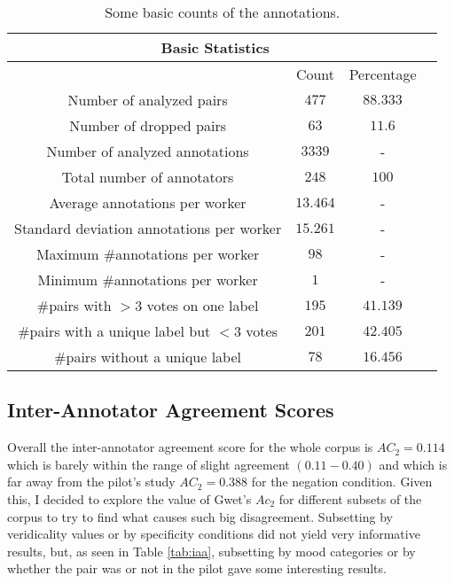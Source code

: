 \begin{table}
\begin{tabular}{|c|c|c|c|}
\hline
\multicolumn{3}{|c|}{Basic Statistics}\\\hline
                      & Count&Percentage\\\hline 
Number of analyzed pairs & $477$ & $88.333$\\\hline
Number of dropped pairs & $63$ & $11.6$\\\hline
Number of analyzed annotations & $3339$ & - \\\hline
Total number of annotators & $248$ & $100$\\\hline
Average annotations per worker & $13.464$ & - \\\hline
Standard deviation annotations per worker & $15.261$ & -\\\hline
Maximum \#annotations per worker & $98$ & - \\\hline
Minimum \#annotations per worker & $1$  & - \\\hline 
\#pairs with $>3$ votes on one label &  $195$ & $41.139$\\\hline
\#pairs with a unique label but $<3$ votes & $201$ & $42.405$ \\\hline                       
\#pairs without a unique label & $78$ & $16.456$\\\hline
\end{tabular}
\caption[Basic counts of the annotations.]{Some basic counts of the annotations.}
\label{tab:basstats}
\end{table}

\subsection{Inter-Annotator Agreement Scores}\label{subsect:iaa}

Overall the inter-annotator agreement score for the whole corpus is $AC_2=0.114$ which is barely within the range of slight agreement $(0.11-0.40)$ \citep{shrout1998measurement} and which is far away from the pilot's study $AC_2=0.388$ for the negation condition. Given this, I decided to explore the value of Gwet's $Ac_2$ for different subsets of the corpus to try to find what causes such big disagreement. Subsetting by veridicality values or by specificity conditions did not yield very informative results, but, as seen in Table \ref{tab:iaa}, subsetting by mood categories or by whether the pair was or not in the pilot gave some interesting results.\\

